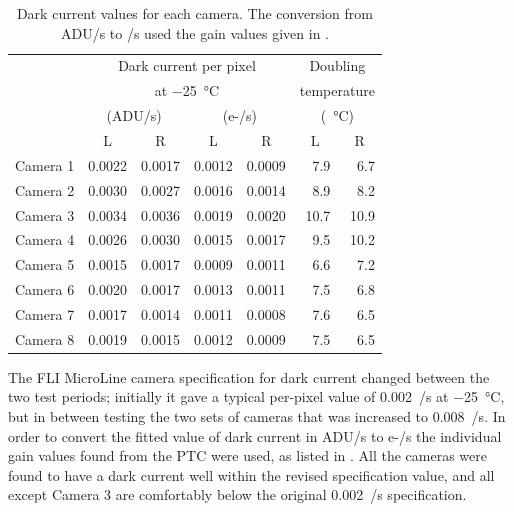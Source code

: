 \begin{colsection}
\begin{colsection}
\begin{table}[t]
    \begin{center}
        \begin{tabular}{c|cc|cc|rr} %
             &
            \multicolumn{4}{c|}{Dark current per pixel} &
            \multicolumn{2}{c}{Doubling} \\
             &
            \multicolumn{4}{c|}{at \SI{-25}{\celsius}} &
            \multicolumn{2}{c}{temperature} \\
             &
            \multicolumn{2}{c|}{(ADU/s)} &
            \multicolumn{2}{c|}{(e-/s)} &
            \multicolumn{2}{c}{(\SI{}{\celsius})} \\
             & L & R & L & R &
             \multicolumn{1}{c}{L} & \multicolumn{1}{c}{R} \\
            \midrule
            Camera 1 & 0.0022 & 0.0017 & 0.0012 & 0.0009 &  7.9 &  6.7 \\
            Camera 2 & 0.0030 & 0.0027 & 0.0016 & 0.0014 &  8.9 &  8.2 \\
            Camera 3 & 0.0034 & 0.0036 & 0.0019 & 0.0020 & 10.7 & 10.9 \\
            Camera 4 & 0.0026 & 0.0030 & 0.0015 & 0.0017 &  9.5 & 10.2 \\
            Camera 5 & 0.0015 & 0.0017 & 0.0009 & 0.0011 &  6.6 &  7.2 \\
            Camera 6 & 0.0020 & 0.0017 & 0.0013 & 0.0011 &  7.5 &  6.8 \\
            Camera 7 & 0.0017 & 0.0014 & 0.0011 & 0.0008 &  7.6 &  6.5 \\
            Camera 8 & 0.0019 & 0.0015 & 0.0012 & 0.0009 &  7.5 &  6.5 \\
        \end{tabular}
    \end{center}
    \caption[Dark current values]{
        Dark current values for each camera. The conversion from ADU/s to \elec/s used the gain values given in .
        }\label{tab:dc}
\end{table}

The FLI MicroLine camera specification for dark current changed between the two test periods; initially it gave a typical per-pixel value of 0.002~\elec/s at \SI{-25}{\celsius}, but in between testing the two sets of cameras that was increased to 0.008~\elec/s. In order to convert the fitted value of dark current in ADU/s to e-/s the individual gain values found from the PTC were used, as listed in . All the cameras were found to have a dark current well within the revised specification value, and all except Camera 3 are comfortably below the original 0.002~\elec/s specification.


\end{colsection}
\end{colsection}
